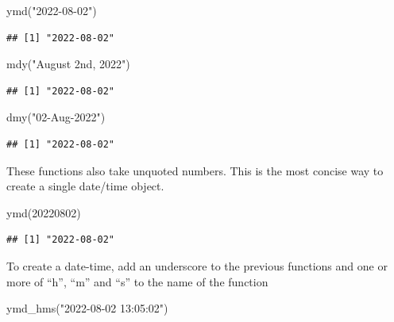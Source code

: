 \documentclass[
]{book}
\newenvironment{Shaded}{\begin{snugshade}}{\end{snugshade}}
\newcommand{\DecValTok}[1]{\textcolor[rgb]{0.00,0.00,0.81}{#1}}
\newcommand{\FunctionTok}[1]{\textcolor[rgb]{0.00,0.00,0.00}{#1}}
\newcommand{\NormalTok}[1]{#1}
\newcommand{\StringTok}[1]{\textcolor[rgb]{0.31,0.60,0.02}{#1}}
\begin{document}
\begin{Shaded}
\begin{Highlighting}[]
\FunctionTok{ymd}\NormalTok{(}\StringTok{"2022{-}08{-}02"}\NormalTok{)}
\end{Highlighting}
\end{Shaded}

\begin{verbatim}
## [1] "2022-08-02"
\end{verbatim}

\begin{Shaded}
\begin{Highlighting}[]
\FunctionTok{mdy}\NormalTok{(}\StringTok{"August 2nd, 2022"}\NormalTok{)}
\end{Highlighting}
\end{Shaded}

\begin{verbatim}
## [1] "2022-08-02"
\end{verbatim}

\begin{Shaded}
\begin{Highlighting}[]
\FunctionTok{dmy}\NormalTok{(}\StringTok{"02{-}Aug{-}2022"}\NormalTok{)}
\end{Highlighting}
\end{Shaded}

\begin{verbatim}
## [1] "2022-08-02"
\end{verbatim}

These functions also take unquoted numbers. This is the most concise way to create a single date/time object.

\begin{Shaded}
\begin{Highlighting}[]
\FunctionTok{ymd}\NormalTok{(}\DecValTok{20220802}\NormalTok{)}
\end{Highlighting}
\end{Shaded}

\begin{verbatim}
## [1] "2022-08-02"
\end{verbatim}

To create a date-time, add an underscore to the previous functions and one or more of ``h'', ``m'' and ``s'' to the name of the function

\begin{Shaded}
\begin{Highlighting}[]
\FunctionTok{ymd\_hms}\NormalTok{(}\StringTok{"2022{-}08{-}02 13:05:02"}\NormalTok{)}
\end{Highlighting}
\end{Shaded}
\end{document}
